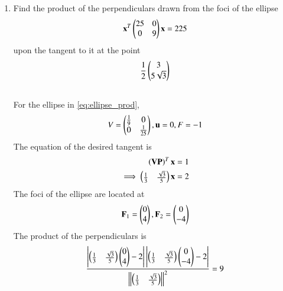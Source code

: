 \begin{enumerate}[label=\arabic*.,ref=\thesubsection.\theenumi]
\item Find the product of the perpendiculars drawn from the foci of the ellipse
\begin{equation}
\label{eq:ellipse_prod}
\mathbf{x}^T\begin{pmatrix}25 & 0 \\ 0 & 9\end{pmatrix}\mathbf{x}  = 225
\end{equation}
upon the tangent to it at the point
\begin{equation}
\frac{1}{2}\begin{pmatrix}3\\ 5 \sqrt{3}\end{pmatrix}
\end{equation}
\\
\solution For the ellipse in \eqref{eq:ellipse_prod},
\begin{align}
\label{eq:ellipse_prod_param}
V = \begin{pmatrix}\frac{1}{9} & 0 \\ 0 & \frac{1}{25}\end{pmatrix}, \mathbf{u} = 0, F=-1
\end{align}
%
The equation of the desired tangent is
\begin{align}
\label{eq:ellipse_prod_tangent}
\left(\mathbf{V}\mathbf{P}\right)^T\mathbf{x}&=1
\\
\implies \begin{pmatrix}\frac{1}{3} & \frac{\sqrt{3}}{5}\end{pmatrix}\mathbf{x}&=2
\end{align}
%
The foci of the ellipse are located at
\begin{align}
\mathbf{F}_1 = \begin{pmatrix}0\\4\end{pmatrix},
\mathbf{F}_2 = \begin{pmatrix}0\\-4\end{pmatrix}
\end{align}
The product of the perpendiculars is
\begin{align}
\frac{\left\vert\begin{pmatrix}\frac{1}{3} & \frac{\sqrt{3}}{5}\end{pmatrix}\begin{pmatrix}0\\4\end{pmatrix}-2\right\vert\left\vert\begin{pmatrix}\frac{1}{3} & \frac{\sqrt{3}}{5}\end{pmatrix}\begin{pmatrix}0\\-4\end{pmatrix}-2\right\vert}{\left\lVert\begin{pmatrix}\frac{1}{3} & \frac{\sqrt{3}}{5}\end{pmatrix}\right\rVert^2}
=9
\end{align}


\end{enumerate}

